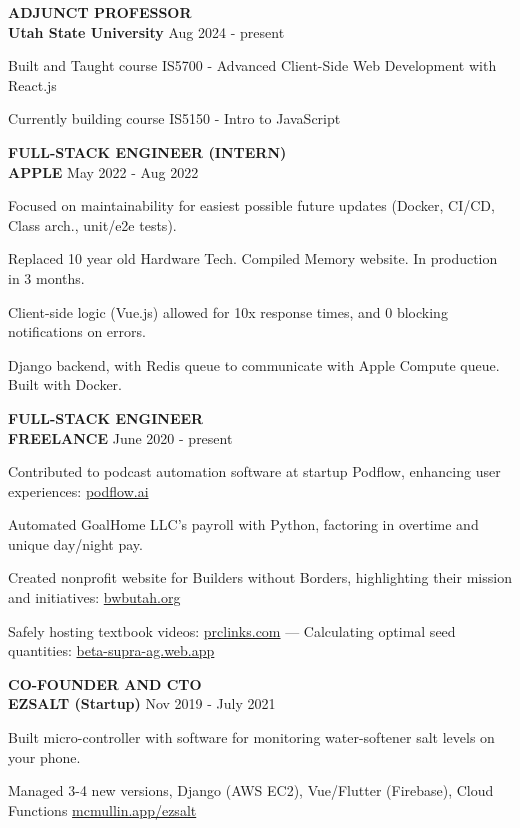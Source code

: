 \documentclass[a4paper,11pt]{article}
\newcommand{\bub}[1]{{\color{color} \MakeUppercase{\textbf{#1}}}}
\newcommand{\experience}[4]{
    \bub{#1} \\
    \textbf{#2} \hfill #3
    \begin{iitemize}
        #4
    \end{iitemize}
}
\begin{document}
\experience{Adjunct Professor}{Utah State University}{Aug 2024 - present}{
    \item Built and Taught course IS5700 - Advanced Client-Side Web Development with React.js
    \item Currently building course IS5150 - Intro to JavaScript
}


\experience{Full-Stack Engineer (Intern)}{APPLE}{May 2022 - Aug 2022}{
    \item Focused on maintainability for easiest possible future updates (Docker, CI/CD, Class arch., unit/e2e tests).
    \item Replaced 10 year old Hardware Tech. Compiled Memory website. In production in 3 months.
    \item Client-side logic (Vue.js) allowed for 10x response times, and 0 blocking notifications on errors. 
    \item Django backend, with Redis queue to communicate with Apple Compute queue. Built with Docker. 
}

\experience{Full-Stack Engineer}{FREELANCE}{June 2020 - present}{
    \item Contributed to podcast automation software at startup   Podflow, enhancing user experiences: \href{https://app.podflow.ai}{podflow.ai}
    \item Automated GoalHome LLC's payroll with Python, factoring in overtime and unique day/night pay.
    \item Created nonprofit website for Builders without Borders, highlighting their mission and initiatives: \href{https://bwbutah.org}{bwbutah.org}
    \item Safely hosting textbook videos: \href{https://prclinks.com}{prclinks.com} --- Calculating optimal seed quantities: \href{https://beta-supra-ag.web.app}{beta-supra-ag.web.app}
}

\experience{Co-Founder and CTO}{EZSALT (Startup)}{Nov 2019 - July 2021}{
    \item Built micro-controller with software for monitoring water-softener salt levels on your phone.
    \item Managed 3-4 new versions, Django (AWS EC2), Vue/Flutter (Firebase), Cloud Functions \href{https://mcmullin.app/ezsalt}{mcmullin.app/ezsalt}
}
\end{document}

